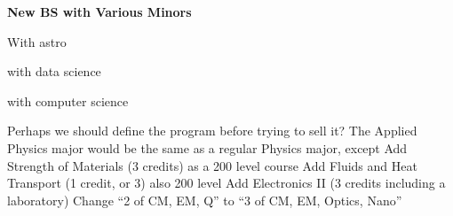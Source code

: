 \documentclass[12pt,preprint]{aastex}
\begin{document}
{\large \sc \textbf{New BS with Various Minors}}
\vspace{-1mm}

With astro

with data science

with computer science



Perhaps we should define the program before trying to sell it?
The Applied Physics major would be the same as a regular Physics major, except
Add Strength of Materials (3 credits) as a 200 level course
Add Fluids and Heat Transport (1 credit, or 3) also 200 level
Add Electronics II (3 credits including a laboratory)
Change “2 of CM, EM, Q” to “3 of CM, EM, 
Optics, Nano”
\end{document}
